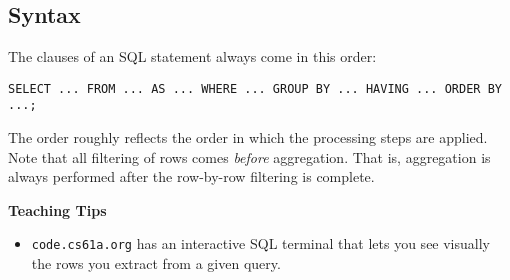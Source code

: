 \subsection{Syntax}
The clauses of an SQL statement always come in this order: 
\begin{lstlisting}
SELECT ... FROM ... AS ... WHERE ... GROUP BY ... HAVING ... ORDER BY ...;
\end{lstlisting}
The order roughly reflects the order in which the processing steps are applied. Note that all filtering of rows comes \textit{before} aggregation. That is, aggregation is always performed after the row-by-row filtering is complete. 

\begin{guide}
\begin{blocksection}
\textbf{Teaching Tips}
\begin{itemize}
    \item \lstinline{code.cs61a.org} has an interactive SQL terminal that lets you see visually the rows you extract from a given query.
\end{itemize}
\end{blocksection}
\end{guide}